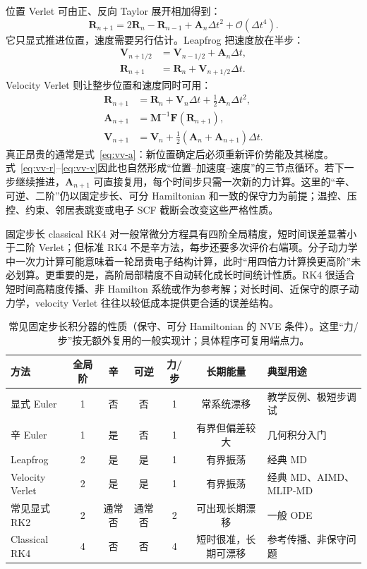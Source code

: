 \documentclass[UTF8,10pt,a4paper,fontset=none]{ctexart}
\begin{document}
位置 Verlet 可由正、反向 Taylor 展开相加得到：
\begin{equation}
  \bm R_{n+1}=2\bm R_n-\bm R_{n-1}+\bm A_n\Delta t^2+\mathcal O(\Delta t^4).
\end{equation}
它只显式推进位置，速度需要另行估计。Leapfrog 把速度放在半步：
\begin{align}
  \bm V_{n+1/2}&=\bm V_{n-1/2}+\bm A_n\Delta t,\\
  \bm R_{n+1}&=\bm R_n+\bm V_{n+1/2}\Delta t.
\end{align}
Velocity Verlet 则让整步位置和速度同时可用\cite{swope1982}：
\begin{align}
  \bm R_{n+1}&=\bm R_n+\bm V_n\Delta t+\frac12\bm A_n\Delta t^2,
  \label{eq:vv-r}\\
  \bm A_{n+1}&=\bm M^{-1}\bm F(\bm R_{n+1}),
  \label{eq:vv-a}\\
  \bm V_{n+1}&=\bm V_n+\frac12(\bm A_n+\bm A_{n+1})\Delta t.
  \label{eq:vv-v}
\end{align}
真正昂贵的通常是式~\eqref{eq:vv-a}：新位置确定后必须重新评价势能及其梯度。式~\eqref{eq:vv-r}--\eqref{eq:vv-v}因此也自然形成“位置--加速度--速度”的三节点循环。若下一步继续推进，$\bm A_{n+1}$ 可直接复用，每个时间步只需一次新的力计算。这里的“辛、可逆、二阶”仍以固定步长、可分 Hamiltonian 和一致的保守力为前提；温控、压控、约束、邻居表跳变或电子 SCF 截断会改变这些严格性质。

固定步长 classical RK4 对一般常微分方程具有四阶全局精度，短时间误差显著小于二阶 Verlet；但标准 RK4 不是辛方法，每步还要多次评价右端项。分子动力学中一次力计算可能意味着一轮昂贵电子结构计算，此时“用四倍力计算换更高阶”未必划算。更重要的是，高阶局部精度不自动转化成长时间统计性质。RK4 很适合短时间高精度传播、非 Hamilton 系统或作为参考解；对长时间、近保守的原子动力学，velocity Verlet 往往以较低成本提供更合适的误差结构。

\begin{table}[htbp]
\centering
\caption{常见固定步长积分器的性质（保守、可分 Hamiltonian 的 NVE 条件）。这里“力/步”按无额外复用的一般实现计；具体程序可复用端点力。}
\small
\begin{tabularx}{\textwidth}{lcccccX}
\toprule
方法 & 全局阶 & 辛 & 可逆 & 力/步 & 长期能量 & 典型用途 \\
\midrule
显式 Euler & 1 & 否 & 否 & 1 & 常系统漂移 & 教学反例、极短步调试 \\
辛 Euler & 1 & 是 & 否 & 1 & 有界但偏差较大 & 几何积分入门 \\
Leapfrog & 2 & 是 & 是 & 1 & 有界振荡 & 经典 MD \\
Velocity Verlet & 2 & 是 & 是 & 1 & 有界振荡 & 经典 MD、AIMD、MLIP-MD \\
常见显式 RK2 & 2 & 通常否 & 通常否 & 2 & 可出现长期漂移 & 一般 ODE \\
Classical RK4 & 4 & 否 & 否 & 4 & 短时很准，长期可漂移 & 参考传播、非保守问题 \\
\bottomrule
\end{tabularx}
\end{table}
\end{document}
